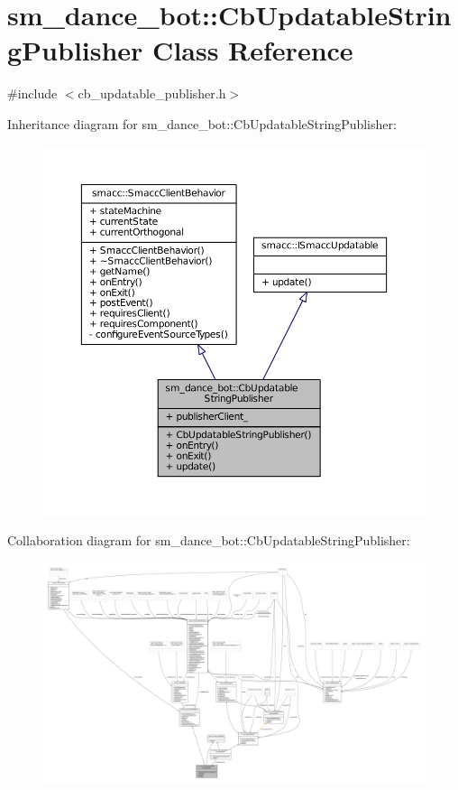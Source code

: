\hypertarget{classsm__dance__bot_1_1CbUpdatableStringPublisher}{}\section{sm\+\_\+dance\+\_\+bot\+:\+:Cb\+Updatable\+String\+Publisher Class Reference}
\label{classsm__dance__bot_1_1CbUpdatableStringPublisher}


{\ttfamily \#include $<$cb\+\_\+updatable\+\_\+publisher.\+h$>$}



Inheritance diagram for sm\+\_\+dance\+\_\+bot\+:\+:Cb\+Updatable\+String\+Publisher\+:
\nopagebreak
\begin{figure}[H]
\begin{center}
\leavevmode
\includegraphics[width=350pt]{classsm__dance__bot_1_1CbUpdatableStringPublisher__inherit__graph}
\end{center}
\end{figure}


Collaboration diagram for sm\+\_\+dance\+\_\+bot\+:\+:Cb\+Updatable\+String\+Publisher\+:
\nopagebreak
\begin{figure}[H]
\begin{center}
\leavevmode
\includegraphics[width=350pt]{classsm__dance__bot_1_1CbUpdatableStringPublisher__coll__graph}
\end{center}
\end{figure}
